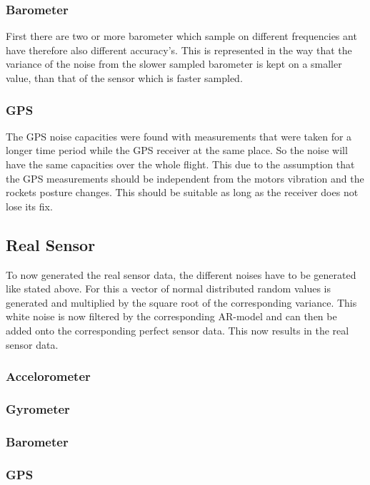 \subsubsection{Barometer}
First there are two or more barometer which sample on different frequencies ant have therefore also different accuracy's.
This is represented in the way that the variance of the noise from the slower sampled barometer is kept on a smaller value,
than that of the sensor which is faster sampled.

\subsubsection{GPS}
The GPS noise capacities were found with measurements that were taken for a longer time period while the GPS receiver at the same place.
So the noise will have the same capacities over the whole flight.
This due to the assumption that the GPS measurements should be independent from the motors vibration and the rockets posture changes.
This should be suitable as long as the receiver does not lose its fix.

\subsection{Real Sensor}
To now generated the real sensor data, the different noises have to be generated like stated above.
For this a vector of normal distributed random values is generated and multiplied by the square root of the corresponding variance.
This white noise is now filtered by the corresponding AR-model and can then be added onto the corresponding perfect sensor data.
This now results in the real sensor data.

\subsubsection{Accelorometer}


\subsubsection{Gyrometer}


\subsubsection{Barometer}


\subsubsection{GPS}



